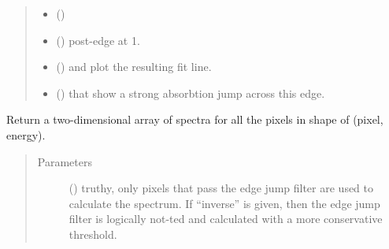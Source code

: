 \documentclass[letterpaper,10pt,english]{sphinxmanual}
\begin{document}
\begin{fulllineitems}
\begin{fulllineitems}
\begin{quote}
\begin{description}
\begin{itemize}
\item {} 
 () \textendash{} 

\item {} 
\sphinxstyleliteralstrong{, } ({\hyperref[\detokenize{xanespy:xanespy.xanes_frameset.XanesFrameset.normalize}]{}}) \textendash{} post-edge at 1.

\item {} 
\sphinxstyleliteralstrong{, } () \textendash{} and plot the resulting fit line.

\item {} 
\sphinxstyleliteralstrong{, } () \textendash{} that show a strong absorbtion jump across this edge.

\end{itemize}

\end{description}\end{quote}

\end{fulllineitems}


\begin{fulllineitems}
\label{\detokenize{xanespy:xanespy.xanes_frameset.XanesFrameset.qt_viewer}}
\end{fulllineitems}


\begin{fulllineitems}
\label{\detokenize{xanespy:xanespy.xanes_frameset.XanesFrameset.spectra}}
Return a two-dimensional array of spectra for all the pixels in
shape of (pixel, energy).
\begin{quote}\begin{description}
\item[{Parameters}] \leavevmode
\sphinxstyleliteralstrong{(}\sphinxstyleliteralstrong{)} () \textendash{} truthy, only pixels that pass the edge jump filter are
used to calculate the spectrum. If “inverse” is given,
then the edge jump filter is logically not-ted and
calculated with a more conservative threshold.


\end{description}
\end{quote}
\end{fulllineitems}
\end{fulllineitems}
\end{document}
